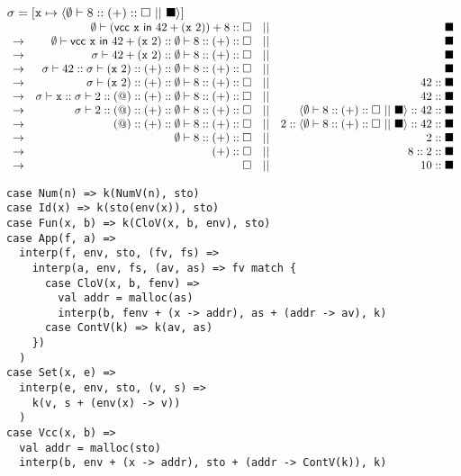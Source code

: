 $\sigma=[\cx\mapsto\langle\emptyset\vdash8::(+)::\square\ ||\ \blacksquare\rangle]$
\\
$
\begin{array}{lrcr}
& \emptyset\vdash (\evcc{\cx}{42+(\cx\ 2)})+8::\square &||& \blacksquare \\
\rightarrow & \emptyset\vdash\evcc{\cx}{42+(\cx\ 2)}
  ::\emptyset\vdash8::(+)::\square &||& \blacksquare \\
\rightarrow & \sigma\vdash42+(\cx\ 2)
  ::\emptyset\vdash8::(+)::\square &||& \blacksquare \\
\rightarrow & \sigma\vdash42::\sigma\vdash(\cx\ 2)::(+)
  ::\emptyset\vdash8::(+)::\square &||& \blacksquare \\
\rightarrow & \sigma\vdash(\cx\ 2)::(+)
  ::\emptyset\vdash8::(+)::\square &||& 42::\blacksquare \\
\rightarrow & \sigma\vdash\cx::\sigma\vdash2::(@)::(+)
  ::\emptyset\vdash8::(+)::\square &||& 42::\blacksquare \\
\rightarrow & \sigma\vdash2::(@)::(+)::\emptyset\vdash8::(+)::\square
  &||& \langle\emptyset\vdash8::(+)::\square\ ||\ \blacksquare\rangle::42::\blacksquare \\
\rightarrow & (@)::(+)::\emptyset\vdash8::(+)::\square
  &||& 2::\langle\emptyset\vdash8::(+)::\square\ ||\ \blacksquare\rangle::42::\blacksquare \\
\rightarrow & \emptyset\vdash8::(+)::\square &||& 2::\blacksquare \\
\rightarrow & (+)::\square &||& 8::2::\blacksquare \\
\rightarrow & \square &||& 10::\blacksquare \\
\end{array}
$
\\

\textbf{}
\vspace{-1em}
\begin{verbatim}
case Num(n) => k(NumV(n), sto)
case Id(x) => k(sto(env(x)), sto)
case Fun(x, b) => k(CloV(x, b, env), sto)
case App(f, a) =>
  interp(f, env, sto, (fv, fs) =>
    interp(a, env, fs, (av, as) => fv match {
      case CloV(x, b, fenv) =>
        val addr = malloc(as)
        interp(b, fenv + (x -> addr), as + (addr -> av), k)
      case ContV(k) => k(av, as)
    })
  )
case Set(x, e) =>
  interp(e, env, sto, (v, s) =>
    k(v, s + (env(x) -> v))
  )
case Vcc(x, b) =>
  val addr = malloc(sto)
  interp(b, env + (x -> addr), sto + (addr -> ContV(k)), k)
\end{verbatim}

